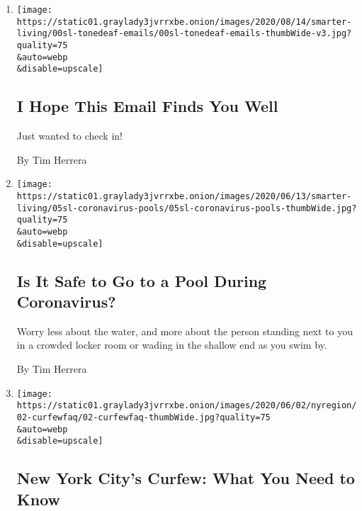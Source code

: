 \begin{enumerate}
\def\labelenumi{\arabic{enumi}.}
\item
  \href{/2020/08/19/smarter-living/coronavirus-how-to-write-better-emails.html}{}

  \texttt{[image: https://static01.graylady3jvrrxbe.onion/images/2020/08/14/smarter-living/00sl-tonedeaf-emails/00sl-tonedeaf-emails-thumbWide-v3.jpg?quality=75\\\&auto=webp\\\&disable=upscale]}

  \hypertarget{i-hope-this-email-finds-you-well}{%
  \subsection{I Hope This Email Finds You
  Well}\label{i-hope-this-email-finds-you-well}}

  Just wanted to check in!

  By Tim Herrera
\item
  \href{/2020/06/05/smarter-living/coronavirus-swimming-pool-water.html}{}

  \texttt{[image: https://static01.graylady3jvrrxbe.onion/images/2020/06/13/smarter-living/05sl-coronavirus-pools/05sl-coronavirus-pools-thumbWide.jpg?quality=75\\\&auto=webp\\\&disable=upscale]}

  \hypertarget{is-it-safe-to-go-to-a-pool-during-coronavirus}{%
  \subsection{Is It Safe to Go to a Pool During
  Coronavirus?}\label{is-it-safe-to-go-to-a-pool-during-coronavirus}}

  Worry less about the water, and more about the person standing next to
  you in a crowded locker room or wading in the shallow end as you swim
  by.

  By Tim Herrera
\item
  \href{/article/nyc-curfew.html}{}

  \texttt{[image: https://static01.graylady3jvrrxbe.onion/images/2020/06/02/nyregion/02-curfewfaq/02-curfewfaq-thumbWide.jpg?quality=75\\\&auto=webp\\\&disable=upscale]}

  \hypertarget{new-york-citys-curfew-what-you-need-to-know}{%
  \subsection{New York City's Curfew: What You Need to
  Know}\label{new-york-citys-curfew-what-you-need-to-know}}


\end{enumerate}
